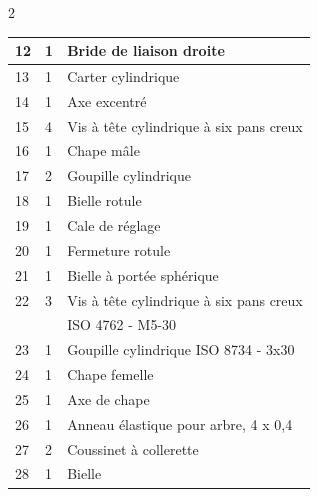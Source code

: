\begin{multicols}{2}
\begin{marginfigure}
\begin{tabular}{|l|l|l|}
12&
1&
Bride de liaison droite \\ \hline %
13&
1&
Carter cylindrique\\ \hline %
14&
1&
Axe excentré \\ \hline %
15&
4&
Vis à tête cylindrique à six pans creux\\ \hline %
16&
1&
Chape mâle\\ \hline %
17&
2&
Goupille cylindrique \\ \hline %
18&
1&
Bielle rotule \\ \hline %
19&
1&
Cale de réglage \\ \hline %
20&
1&
Fermeture rotule \\ \hline %
21&
1&
Bielle à portée sphérique \\ \hline %
22&
3&
Vis à tête cylindrique à six pans creux  \\
&& ISO 4762 - M5-30 \\ \hline %
23&
1&
Goupille cylindrique ISO 8734 - 3x30  \\ \hline %
24&
1&
Chape femelle \\ \hline %

25&
1&
Axe de chape \\ \hline %
26&
1&
Anneau élastique pour arbre, 4 x 0,4 \\ \hline %
27&
2&
Coussinet à collerette \\ \hline %
28&
1&
Bielle \\ \hline %
\end{tabular}
\end{marginfigure}


\end{multicols}
